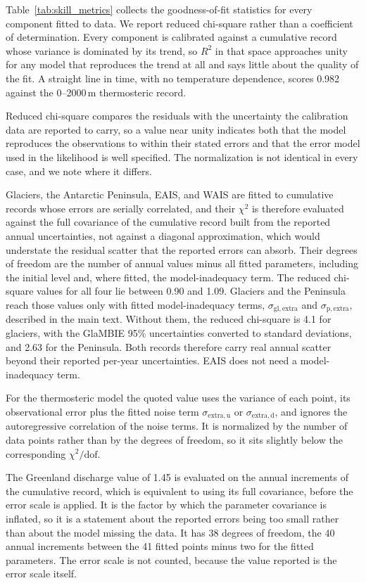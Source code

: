 \documentclass[12pt]{article}
\begin{document}
Table~\ref{tab:skill_metrics} collects the goodness-of-fit statistics for every component fitted to data. We report reduced chi-square rather than a coefficient of determination. Every component is calibrated against a cumulative record whose variance is dominated by its trend, so $R^2$ in that space approaches unity for any model that reproduces the trend at all and says little about the quality of the fit. A straight line in time, with no temperature dependence, scores 0.982 against the 0--2000\,m thermosteric record.

Reduced chi-square compares the residuals with the uncertainty the calibration data are reported to carry, so a value near unity indicates both that the model reproduces the observations to within their stated errors and that the error model used in the likelihood is well specified. The normalization is not identical in every case, and we note where it differs.

Glaciers, the Antarctic Peninsula, EAIS, and WAIS are fitted to cumulative records whose errors are serially correlated, and their $\chi^2$ is therefore evaluated against the full covariance of the cumulative record built from the reported annual uncertainties, not against a diagonal approximation, which would understate the residual scatter that the reported errors can absorb. Their degrees of freedom are the number of annual values minus all fitted parameters, including the initial level and, where fitted, the model-inadequacy term. The reduced chi-square values for all four lie between 0.90 and 1.09. Glaciers and the Peninsula reach those values only with fitted model-inadequacy terms, $\sigma_{\mathrm{gl,extra}}$ and $\sigma_{\mathrm{p,extra}}$, described in the main text. Without them, the reduced chi-square is 4.1 for glaciers, with the GlaMBIE 95\% uncertainties converted to standard deviations, and 2.63 for the Peninsula. Both records therefore carry real annual scatter beyond their reported per-year uncertainties. EAIS does not need a model-inadequacy term.

For the thermosteric model the quoted value uses the variance of each point, its observational error plus the fitted noise term $\sigma_{\mathrm{extra,u}}$ or $\sigma_{\mathrm{extra,d}}$, and ignores the autoregressive correlation of the noise terms. It is normalized by the number of data points rather than by the degrees of freedom, so it sits slightly below the corresponding $\chi^2/\mathrm{dof}$.

The Greenland discharge value of 1.45 is evaluated on the annual increments of the cumulative record, which is equivalent to using its full covariance, before the error scale is applied. It is the factor by which the parameter covariance is inflated, so it is a statement about the reported errors being too small rather than about the model missing the data. It has 38 degrees of freedom, the 40 annual increments between the 41 fitted points minus two for the fitted parameters. The error scale is not counted, because the value reported is the error scale itself.
\end{document}
